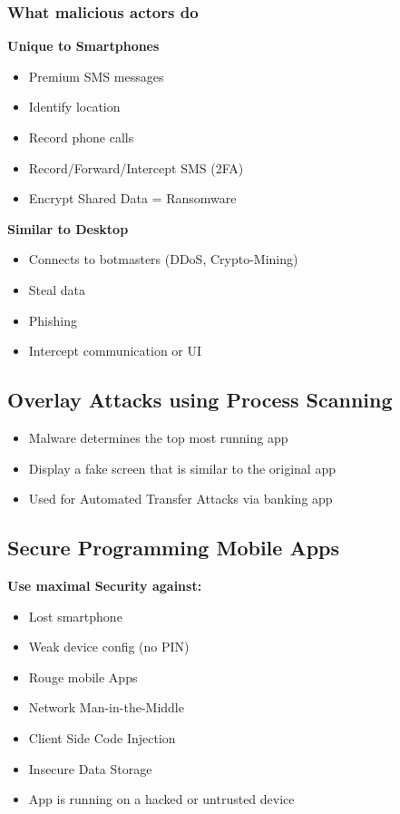 \subsubsection{What malicious actors do}
\textbf{Unique to Smartphones}
\begin{itemize}
    \item Premium SMS messages
    \item Identify location
    \item Record phone calls
    \item Record/Forward/Intercept SMS (2FA)
    \item Encrypt Shared Data = Ransomware
\end{itemize}
\textbf{Similar to Desktop}
\begin{itemize}
    \item Connects to botmasters (DDoS, Crypto-Mining)
    \item Steal data
    \item Phishing
    \item Intercept communication or UI
\end{itemize}

\subsection{Overlay Attacks using Process Scanning}
\begin{itemize}
    \item Malware determines the top most running app
    \item Display a fake screen that is similar to the original app
    \item Used for Automated Transfer Attacks via banking app
\end{itemize}

\subsection{Secure Programming Mobile Apps}
\textbf{Use maximal Security against:}
\begin{itemize}
    \item Lost smartphone
    \item Weak device config (no PIN)
    \item Rouge mobile Apps
    \item Network Man-in-the-Middle
    \item Client Side Code Injection
    \item Insecure Data Storage
    \item App is running on a hacked or untrusted device
\end{itemize}

